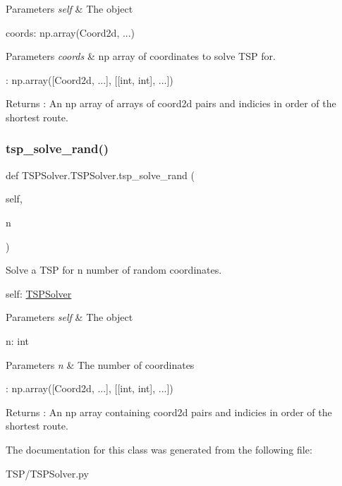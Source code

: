 \begin{DoxyParams}{Parameters}
{\em self} & The object\\
\hline
\end{DoxyParams}
coords\+: np.\+array(Coord2d, ...) 
\begin{DoxyParams}{Parameters}
{\em coords} & np array of coordinates to solve T\+SP for.\\
\hline
\end{DoxyParams}
\+: np.\+array(\mbox{[}Coord2d, ...\mbox{]}, \mbox{[}\mbox{[}int, int\mbox{]}, ...\mbox{]}) \begin{DoxyReturn}{Returns}
\+: An np array of arrays of coord2d pairs and indicies in order of the shortest route. 
\end{DoxyReturn}
\mbox{\label{classTSPSolver_1_1TSPSolver_a1263394b1d33b7c4457cf07fd84baae2}} 
\subsubsection{\texorpdfstring{tsp\+\_\+solve\+\_\+rand()}{tsp\_solve\_rand()}}
{\footnotesize\ttfamily def T\+S\+P\+Solver.\+T\+S\+P\+Solver.\+tsp\+\_\+solve\+\_\+rand (\begin{DoxyParamCaption}\item[{}]{self,  }\item[{}]{n }\end{DoxyParamCaption})}



Solve a T\+SP for n number of random coordinates. 

self\+: \hyperlink{classTSPSolver_1_1TSPSolver}{T\+S\+P\+Solver} 
\begin{DoxyParams}{Parameters}
{\em self} & The object\\
\hline
\end{DoxyParams}
n\+: int 
\begin{DoxyParams}{Parameters}
{\em n} & The number of coordinates\\
\hline
\end{DoxyParams}
\+: np.\+array(\mbox{[}Coord2d, ...\mbox{]}, \mbox{[}\mbox{[}int, int\mbox{]}, ...\mbox{]}) \begin{DoxyReturn}{Returns}
\+: An np array containing coord2d pairs and indicies in order of the shortest route. 
\end{DoxyReturn}


The documentation for this class was generated from the following file\+:\begin{DoxyCompactItemize}
\item 
T\+S\+P/T\+S\+P\+Solver.\+py\end{DoxyCompactItemize}
